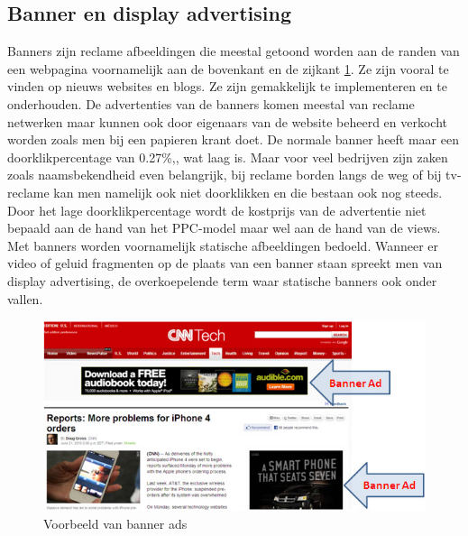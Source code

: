 \documentclass[pdftex,a4paper,12pt,twoside]{report}
\begin{document}
\subsection{Banner en display advertising }
\label{sec Banner en display advertising }
Banners zijn reclame afbeeldingen die meestal getoond worden aan de randen van een webpagina voornamelijk aan de bovenkant en de zijkant \ref{fig: Banner-Ads}. Ze zijn vooral te vinden op nieuws websites en blogs. Ze zijn gemakkelijk te implementeren en te onderhouden. De advertenties van de banners komen meestal van reclame netwerken maar kunnen ook door eigenaars van de website beheerd en verkocht worden zoals men bij een papieren krant doet. De normale banner heeft maar een doorklikpercentage van 0.27\%,\cite{Chaffey2016}, wat laag is. Maar voor veel bedrijven zijn zaken zoals naamsbekendheid even belangrijk, bij reclame borden langs de weg of bij tv-reclame kan men namelijk ook niet doorklikken en die bestaan ook nog steeds. Door het lage doorklikpercentage wordt de kostprijs van de advertentie niet bepaald aan de hand van het PPC-model maar wel aan de hand van de views. Met banners worden voornamelijk statische afbeeldingen bedoeld. Wanneer er video of geluid fragmenten op de plaats van een banner staan spreekt men van display advertising, de overkoepelende term waar statische banners ook onder vallen.
\begin{figure}[h!]
\centering
\includegraphics[width=12cm]{img/Banner-Ads}
\caption{Voorbeeld van banner ads}
\label{fig: Banner-Ads}
\end{figure}
\end{document}
